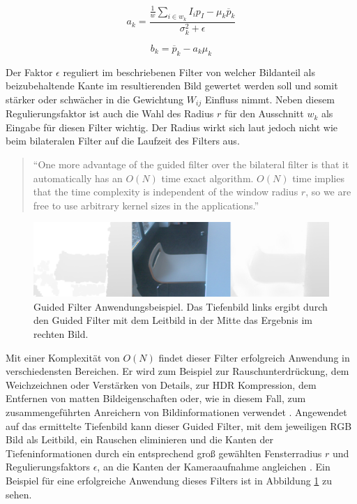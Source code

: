 \begin{equation} \label{eq:gf-a}
a_k = \frac{\frac{1}{w} \sum_{i \in w_k} I_i p_I - \mu_k \overline{p}_k}{\sigma_k^2+\epsilon}
\end{equation}

\begin{equation} \label{eq:gf-b}
b_k = \overline{p}_k - a_k\mu_k
\end{equation}

Der Faktor \(\epsilon\) reguliert im beschriebenen Filter von \citet{he2010guided} welcher Bildanteil als beizubehaltende Kante im resultierenden Bild gewertet werden soll und somit stärker oder schwächer in die Gewichtung \(W_{ij}\) Einfluss nimmt. Neben diesem Regulierungsfaktor ist auch die Wahl des Radius \(r\) für den Ausschnitt \(w_k\) als Eingabe für diesen Filter wichtig. Der Radius wirkt sich laut \citet{he2010guided} jedoch nicht wie beim bilateralen Filter auf die Laufzeit des Filters aus. 

\begin{quote}
\enquote{One more advantage of the guided filter over the bilateral filter is that it automatically has an \(O(N)\) time exact algorithm. \(O(N)\) time implies that the time complexity is independent of the window radius \(r\), so we are free to use arbitrary kernel sizes in the applications.} \citep{he2010guided}
\end{quote}

\begin{figure}[h]
  \centering
	\includegraphics[width=1.0\textwidth]{content/images/methods/gf-result.png} 
  \caption{Guided Filter Anwendungsbeispiel. Das Tiefenbild links ergibt durch den Guided Filter mit dem Leitbild in der Mitte das Ergebnis im rechten Bild.}
  \label{fig:gf-result}
\end{figure}

Mit einer Komplexität von \(O(N)\) findet dieser Filter erfolgreich Anwendung in verschiedensten Bereichen. Er wird zum Beispiel zur Rauschunterdrückung, dem Weichzeichnen oder Verstärken von Details, zur HDR Kompression, dem Entfernen von matten Bildeigenschaften oder, wie in diesem Fall, zum zusammengeführten Anreichern von Bildinformationen verwendet \citep{he2010guided}. Angewendet auf das ermittelte Tiefenbild kann dieser Guided Filter, mit dem jeweiligen RGB Bild als Leitbild, ein Rauschen eliminieren und die Kanten der Tiefeninformationen durch ein entsprechend groß gewählten Fensterradius \(r\) und Regulierungsfaktors \(\epsilon\), an die Kanten der Kameraaufnahme angleichen \citep{liu2012guided}. Ein Beispiel für eine erfolgreiche Anwendung dieses Filters ist in Abbildung \ref{fig:gf-result} zu sehen.


